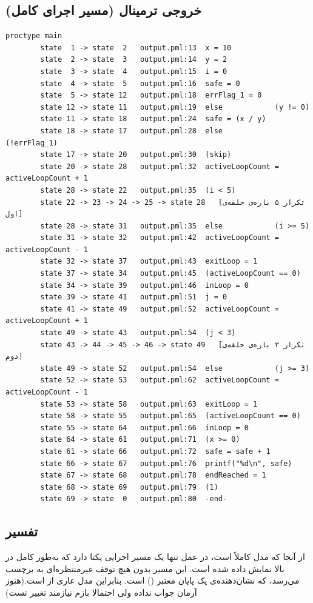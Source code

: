\documentclass[12pt,a4paper]{article}
\begin{document}
\subsection{خروجی ترمینال (مسیر اجرای کامل)}
\begin{latin}
	\begin{lstlisting}[style=termstyle,basicstyle=\ttfamily\scriptsize]
		proctype main
		state  1 -> state  2   output.pml:13  x = 10
		state  2 -> state  3   output.pml:14  y = 2
		state  3 -> state  4   output.pml:15  i = 0
		state  4 -> state  5   output.pml:16  safe = 0
		state  5 -> state 12   output.pml:18  errFlag_1 = 0
		state 12 -> state 11   output.pml:19  else            (y != 0)
		state 11 -> state 18   output.pml:24  safe = (x / y)
		state 18 -> state 17   output.pml:28  else            (!errFlag_1)
		state 17 -> state 20   output.pml:30  (skip)
		state 20 -> state 28   output.pml:32  activeLoopCount = activeLoopCount + 1
		state 28 -> state 22   output.pml:35  (i < 5)
		state 22 -> 23 -> 24 -> 25 -> state 28   [تکرار ۵ باره‌ی حلقه‌ی اول]
		state 28 -> state 31   output.pml:35  else            (i >= 5)
		state 31 -> state 32   output.pml:42  activeLoopCount = activeLoopCount - 1
		state 32 -> state 37   output.pml:43  exitLoop = 1
		state 37 -> state 34   output.pml:45  (activeLoopCount == 0)
		state 34 -> state 39   output.pml:46  inLoop = 0
		state 39 -> state 41   output.pml:51  j = 0
		state 41 -> state 49   output.pml:52  activeLoopCount = activeLoopCount + 1
		state 49 -> state 43   output.pml:54  (j < 3)
		state 43 -> 44 -> 45 -> 46 -> state 49   [تکرار ۳ باره‌ی حلقه‌ی دوم]
		state 49 -> state 52   output.pml:54  else            (j >= 3)
		state 52 -> state 53   output.pml:62  activeLoopCount = activeLoopCount - 1
		state 53 -> state 58   output.pml:63  exitLoop = 1
		state 58 -> state 55   output.pml:65  (activeLoopCount == 0)
		state 55 -> state 64   output.pml:66  inLoop = 0
		state 64 -> state 61   output.pml:71  (x >= 0)
		state 61 -> state 66   output.pml:72  safe = safe + 1
		state 66 -> state 67   output.pml:76  printf("%d\n", safe)
		state 67 -> state 68   output.pml:78  endReached = 1
		state 68 -> state 69   output.pml:79  (1)
		state 69 -> state  0   output.pml:80  -end-
	\end{lstlisting}
\end{latin}

\subsection{تفسیر}	از آنجا که مدل کاملاً  است،  در عمل تنها یک مسیر اجرایی یکتا دارد که به‌طور کامل در بالا نمایش داده شده است. این مسیر بدون هیچ توقف غیرمنتظره‌ای به برچسب  می‌رسد، که نشان‌دهنده‌ی یک پایان معتبر () است. بنابراین مدل عاری از  است.(هنوز آرمان جواب نداده ولی احتمالا بازم نیازمند تغییر تست)
\end{document}
